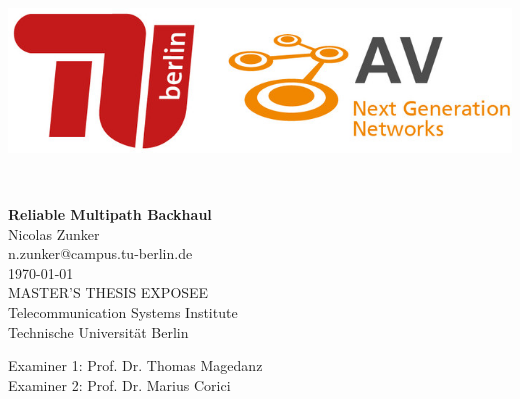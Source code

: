 
\thispagestyle{empty}

\begin{center}
\includegraphics[width=.67\linewidth, height=.2\linewidth]{fig/Logo_Header}
\end{center}
\mbox{}\\[1pc]
\begin{center}
    \huge{ \bfseries Reliable Multipath Backhaul}\\[2pc]

    \Large{Nicolas Zunker}\\
    \large{n.zunker@campus.tu-berlin.de}\\[1pc]
    \large{\today}\\[2pc]

    MASTER'S THESIS EXPOSEE\\
    Telecommunication Systems Institute\\
    Technische Universität Berlin
\end{center}
\vfill

Examiner 1: Prof. Dr. Thomas Magedanz
\hfill{}\\
Examiner 2: Prof. Dr. Marius Corici

\afterpage{\null\thispagestyle{empty}\newpage}
